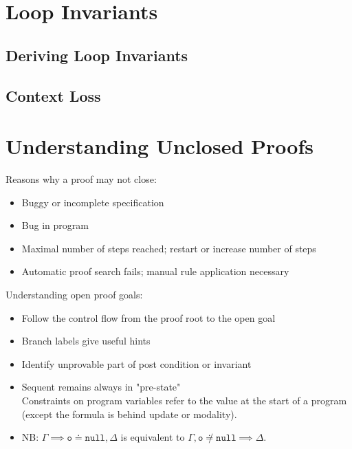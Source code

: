 \documentclass[a4paper, 11pt, accentcolor = tud3b]{tudreport}
\begin{document}
		\section{Loop Invariants} %
			\label{sec:dlLoopInv}
		

			\subsection{Deriving Loop Invariants} %

			\subsection{Context Loss} %

		\section{Understanding Unclosed Proofs}
			Reasons why a proof may not close:
			\begin{itemize}
				\item Buggy or incomplete specification
				\item Bug in program
				\item Maximal number of steps reached; restart or increase number of steps
				\item Automatic proof search fails; manual rule application necessary
			\end{itemize}
		
			Understanding open proof goals:
			\begin{itemize}
				\item Follow the control flow from the proof root to the open goal
				\item Branch labels give useful hints
				\item Identify unprovable part of post condition or invariant
				\item Sequent remains always in "pre-state" \\ Constraints on program variables refer to the value at the start of a program (except the formula is behind update or modality).
				\item NB: \( \Gamma \implies \texttt{o} \doteq \texttt{null}, \Delta \) is equivalent to \( \Gamma, \texttt{o} \not\doteq \texttt{null} \implies \Delta \).
			\end{itemize}
\end{document}
